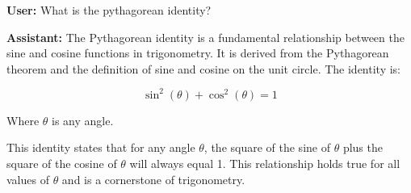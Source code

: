 \documentclass{article}
\begin{document}
\textbf{User:} What is the pythagorean identity?

\textbf{Assistant:} The Pythagorean identity is a fundamental relationship between the sine and cosine functions in trigonometry. It is derived from the Pythagorean theorem and the definition of sine and cosine on the unit circle. The identity is:

\[ \sin^2(\theta) + \cos^2(\theta) = 1 \]

Where \( \theta \) is any angle.

This identity states that for any angle \( \theta \), the square of the sine of \( \theta \) plus the square of the cosine of \( \theta \) will always equal 1. This relationship holds true for all values of \( \theta \) and is a cornerstone of trigonometry.
\end{document}
